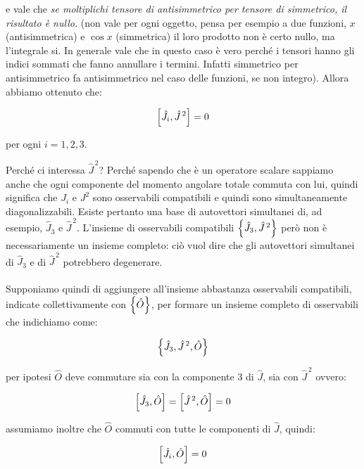 \begin{myprf}
	e vale che \textit{se moltiplichi tensore di antisimmetrico per tensore di simmetrico, il risultato è nullo.} (non vale per ogni oggetto, pensa per esempio a due funzioni, $x$ (antisimmetrica) e $\cos x$ (simmetrica) il loro prodotto non è certo nullo, ma l'integrale si. In generale vale che in questo caso è vero perché i tensori hanno gli indici sommati che fanno annullare i termini. Infatti simmetrico per antisimmetrico fa antisimmetrico nel caso delle funzioni, se non integro). Allora abbiamo ottenuto che:
	
\begin{align*}
	\qty[ \hat{J}_i, \hat{J}^{\, 2} ] = 0
\end{align*}

	per ogni $i = 1, 2, 3$.

\end{myprf}

	Perché ci interessa $\hat{J}^{\, 2}$? Perché sapendo che è un operatore scalare sappiamo anche che ogni componente del momento angolare totale commuta con lui, quindi significa che $J_i$ e $J^2$ sono osservabili compatibili e quindi sono simultaneamente diagonalizzabili. Esiste pertanto una base di
autovettori simultanei di, ad esempio, $\hat{J}_3$ e $\hat{J}^{\, 2}$. L'insieme di osservabili compatibili $\qty{\hat{J}_3, \hat{J}^{\, 2}}$ però non è necessariamente un insieme completo: ciò vuol dire che gli autovettori simultanei di $\hat{J}_3$ e di $\hat{J}^{\, 2}$ potrebbero degenerare.
	\\
	\\
	Supponiamo quindi di aggiungere all'insieme abbastanza osservabili compatibili, indicate collettivamente con $\qty{\hat{O}}$, per formare un insieme completo di osservabili che indichiamo come:
	
\begin{align*}
	\qty{\hat{J}_3, \hat{J}^{\, 2}, \hat{O} }
\end{align*}

	per ipotesi $\hat{O}$ deve commutare sia con la componente $3$ di $\hat{J}$, sia con $\hat{J}^{\, 2}$ ovvero:

 \begin{align*}
 	\qty[\hat{J}_3, \hat{O}] = \qty[\hat{J}^{\, 2}, \hat{O}] = 0
 \end{align*}
 
 	assumiamo inoltre che $\hat{O}$ commuti con tutte le componenti di $\hat{J}$, quindi:
	
\begin{align*}
	\qty[\hat{J}_i, \hat{O}] = 0
\end{align*}

